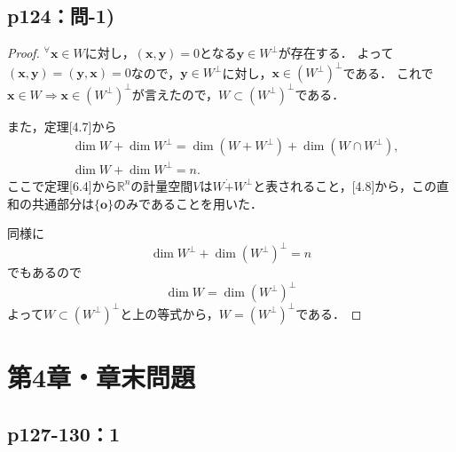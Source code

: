 \documentclass[uplatex,dvipdfmx,a4paper,11pt,fleqn]{jsarticle}
\begin{document}
\subsection*{p124：問-1)}

\begin{tleftbar}
    \begin{proof}
$^{\forall}\bm{x} \in W$に対し，$(\bm{x},\bm{y})=0$となる$\bm{y} \in W^{\perp}$が存在する．
よって$(\bm{x},\bm{y})=(\bm{y},\bm{x})=0$なので，$\bm{y} \in W^{\perp}$に対し，$\bm{x} \in (W^{\perp})^{\perp}$である．
これで$\bm{x} \in W \Longrightarrow \bm{x} \in  (W^{\perp})^{\perp}$が言えたので，$W \subset  (W^{\perp})^{\perp}$である．

また，定理[4.7]から
\begin{align*}
& \dim W +\dim W^{\perp} =\dim (W +W^{\perp} )+\dim (W \cap W^{\perp} ), \\
& \dim W +\dim W^{\perp} =n.
\end{align*}
ここで定理[6.4]から$\mathbb{R}^n$の計量空間$V$は$W\dot{+}W^{\perp}$と表されること，[4.8]から，この直和の共通部分は$\{ \bm{o} \}$のみであることを用いた．

同様に
\[
\dim W^{\perp} +\dim (W^{\perp})^{\perp} =n
\]
でもあるので
\[
\dim W =\dim (W^{\perp})^{\perp}
\]
よって$W \subset  (W^{\perp})^{\perp}$と上の等式から，$W =  (W^{\perp})^{\perp}$である．
\end{proof}
\end{tleftbar}
\newpage
\section*{第4章・章末問題}


\subsection*{p127-130：1}
\end{document}
